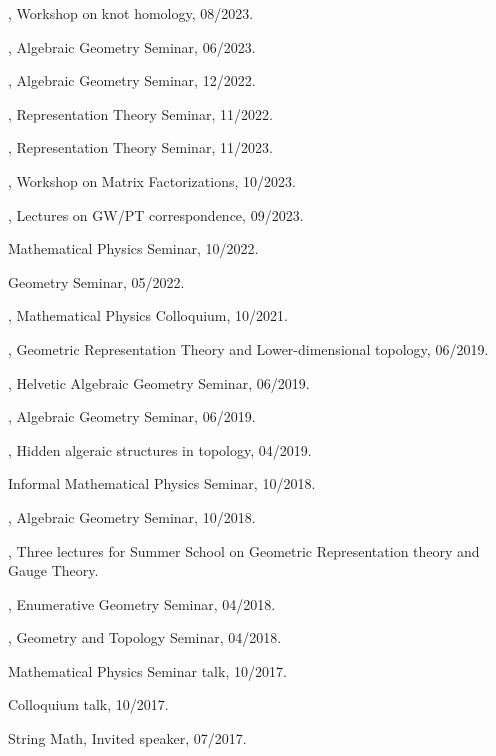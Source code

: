 \documentclass[11pt]{amsart}
\theoremstyle{plain}
\theoremstyle{definition}
\theoremstyle{remark}
\begin{document}
, Workshop on knot homology, 08/2023.

, Algebraic Geometry Seminar, 06/2023.

, Algebraic Geometry Seminar, 12/2022.

, Representation Theory Seminar, 11/2022.

, Representation  Theory Seminar, 11/2023.

, Workshop on Matrix Factorizations, 10/2023.

, Lectures on GW/PT correspondence, 09/2023.

 Mathematical Physics Seminar, 10/2022.

 Geometry Seminar, 05/2022.

, Mathematical Physics Colloquium, 10/2021.

, Geometric Representation Theory and Lower-dimensional topology, 06/2019.

,  Helvetic Algebraic Geometry Seminar, 06/2019.

, Algebraic Geometry Seminar, 06/2019.

, Hidden algeraic structures in topology, 04/2019.

 Informal Mathematical Physics Seminar, 10/2018.

, Algebraic Geometry Seminar, 10/2018.

, Three lectures for Summer School on Geometric Representation theory and
Gauge Theory.

, Enumerative Geometry Seminar, 04/2018.

, Geometry and  Topology Seminar, 04/2018.

 Mathematical Physics Seminar talk, 10/2017.

 Colloquium talk, 10/2017.

 String Math, Invited speaker, 07/2017.
\end{document}
